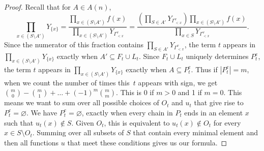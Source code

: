 \documentclass[10pt,a4paper]{amsart}
\numberwithin{equation}{section}
\begin{document}
\begin{proof}
Recall that for $A\in A(n)$,
\[ \prod_{x\in (S\setminus A')}Y_{\{x\}}=\frac{\prod_{x\in (S\setminus A')}f(x)}{\prod_{x\in (S\setminus A')}Y_{\Gamma_{< x}^v}}=\frac{\left(\prod_{S\in A'} Y_{\Gamma_{< x}^v}\right)\prod_{x\in (S\setminus A')}f(x)}{\prod_{x\in S}Y_{\Gamma_{< x}^v}}.\]
Since the numerator of this fraction contains $\prod_{S\in A'} Y_{\Gamma_{< x}^v}$, the term $t$ appears in $\prod_{x\in (S\setminus A')}Y_{\{x\}}$ exactly when $A'\subseteq F_t\cup L_t$. Since $F_t\cup L_t$ uniquely determines $P_t^e$, the term $t$ appears in $\prod_{x\in (S\setminus A')}Y_{\{x\}}$ exactly when $A\subseteq P_t^e$. Thus if $|P_t^e|=m$, when we count the number of times this~$t$ appears with sign, we get ${m \choose 0}-{m \choose 1}+\dots+(-1)^{m}{m \choose m}$. This is 0 if $m>0$ and 1 if $m=0$.
This means we want to sum over all possible choices of $O_t$ and $u_t$ that give rise to $P_t^e=\varnothing$. We have $P_t^e=\varnothing$, exactly when every chain in $P_t$ ends in an element $x$ such that $u_t(x)\not\in S$. Given $O_t$, this is equivalent to $u_t(x)\not\in O_t$ for every $x\in S\setminus O_t$. Summing over all subsets of $S$ that contain every minimal element and then all functions $u$ that meet these conditions gives us our formula.
\end{proof}
\end{document}
